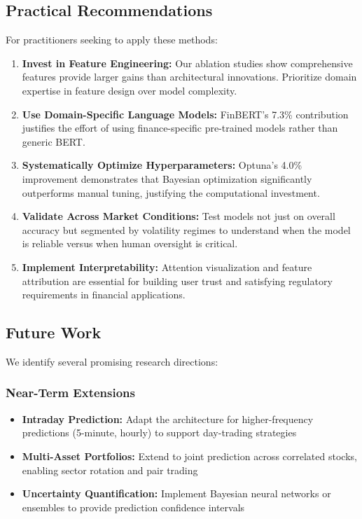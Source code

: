 \documentclass[conference]{IEEEtran}
\begin{document}
\subsection{Practical Recommendations}

For practitioners seeking to apply these methods:

\begin{enumerate}
\item \textbf{Invest in Feature Engineering:} Our ablation studies show comprehensive features provide larger gains than architectural innovations. Prioritize domain expertise in feature design over model complexity.

\item \textbf{Use Domain-Specific Language Models:} FinBERT's 7.3\% contribution justifies the effort of using finance-specific pre-trained models rather than generic BERT.

\item \textbf{Systematically Optimize Hyperparameters:} Optuna's 4.0\% improvement demonstrates that Bayesian optimization significantly outperforms manual tuning, justifying the computational investment.

\item \textbf{Validate Across Market Conditions:} Test models not just on overall accuracy but segmented by volatility regimes to understand when the model is reliable versus when human oversight is critical.

\item \textbf{Implement Interpretability:} Attention visualization and feature attribution are essential for building user trust and satisfying regulatory requirements in financial applications.
\end{enumerate}

\subsection{Future Work}

We identify several promising research directions:

\subsubsection{Near-Term Extensions}
\begin{itemize}
\item \textbf{Intraday Prediction:} Adapt the architecture for higher-frequency predictions (5-minute, hourly) to support day-trading strategies
\item \textbf{Multi-Asset Portfolios:} Extend to joint prediction across correlated stocks, enabling sector rotation and pair trading
\item \textbf{Uncertainty Quantification:} Implement Bayesian neural networks or ensembles to provide prediction confidence intervals
\end{itemize}
\end{document}
